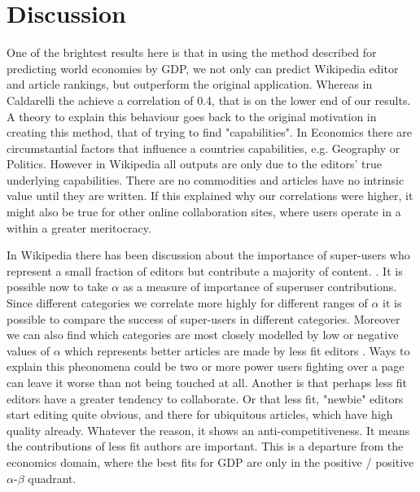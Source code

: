 \documentclass{acm_proc_article-sp}
\begin{document}
\section{Discussion}

One of the brightest results here is that in using the method described for predicting world economies by GDP, we not only can predict Wikipedia editor and article rankings, but outperform the original application. Whereas in Caldarelli the achieve a correlation of 0.4, \cite{Caldarelli} that is on the lower end of our results. A theory to explain this behaviour goes back to the original motivation in creating this method, that of trying to find "capabilities". In Economics there are circumstantial factors that influence a countries capabilities, e.g. Geography or Politics. However in Wikipedia all outputs are only due to the editors' true underlying capabilities. There are no commodities and articles have no intrinsic value until they are written. If this explained why our correlations were higher, it might also be true for other online collaboration sites, where users operate in a within a greater meritocracy.

In Wikipedia there has been discussion about the importance of super-users who represent a small fraction of editors but contribute a majority of content. \cite{website:wikinewsreporter}. It is possible now to take $\alpha$ as a measure of importance of superuser contributions. Since different categories we correlate more highly for different ranges of $\alpha$ it is possible to compare the success of super-users in different categories. Moreover we can also find which categories are most closely modelled by low or negative values of $\alpha$ which represents better articles are made by less fit editors . Ways to explain this pheonomena could be two or more power users fighting over a page can leave it worse than not being touched at all. Another is that perhaps less fit editors have a greater tendency to collaborate. Or that less fit, "newbie" editors start editing quite obvious, and there for ubiquitous articles, which have high quality already.  Whatever the reason,  it shows an anti-competitiveness. It means the contributions of less fit authors are important. This is a departure from the economics domain, where the best fits for GDP are only in the positive / positive $\alpha$-$\beta$ quadrant. 


\end{document}
